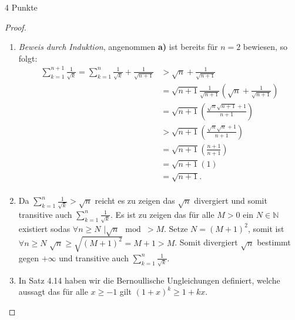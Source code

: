 \documentclass{problemset}
\begin{document}
\begin{problem}{4 Punkte}
\begin{proof}
	\begin{enumerate}
		\item \textit{Beweis durch Induktion}, angenommen \textbf{a)} ist bereits für $n=2$ bewiesen, so folgt: \begin{align*}
			      \sum_{k=1}^{n+1} \frac{1}{\sqrt{k}} = \sum_{k=1}^{n} \frac{1}{\sqrt{k}} + \frac{1}{\sqrt{n + 1}} & > \sqrt{n} + \frac{1}{\sqrt{n + 1}}                                              \\
			                                                                                                       & = \sqrt{n+1} \frac{1}{\sqrt{n+1}} \left(\sqrt{n} + \frac{1}{\sqrt{n + 1}}\right) \\
			                                                                                                       & = \sqrt{n+1} \left(\frac{\sqrt{n}\sqrt{n+1} + 1}{n + 1}\right)                   \\
			                                                                                                       & > \sqrt{n+1} \left(\frac{\sqrt{n}\sqrt{n} + 1}{n + 1}\right)                     \\
			                                                                                                       & = \sqrt{n+1} \left(\frac{n + 1}{n + 1}\right)                                    \\
			                                                                                                       & = \sqrt{n+1} (1)                                                                 \\
			                                                                                                       & = \sqrt{n+1} \tag*{\checkmark}.                                                  \\
		      \end{align*}
		\item Da $\sum_{k=1}^{n} \frac{1}{\sqrt{k}} > \sqrt{n}$ reicht es zu zeigen das $\sqrt{n}$ divergiert und somit transitive auch $\sum_{k=1}^{n} \frac{1}{\sqrt{k}}$.
		      Es ist zu zeigen das für alle $M > 0$ ein $N \in \mathbb{N}$ existiert sodas $\forall n \ge N$ $\mid \sqrt{n} \mod > M$.
		      Setze $N = {(M + 1)}^2$, somit ist $\forall n \ge N$ $\sqrt{n} \ge \sqrt{{(M + 1)}^2} = M+1 > M$.
		      Somit divergiert $\sqrt{n}$ bestimmt gegen $+\infty$ und transitive auch $\sum_{k=1}^{n} \frac{1}{\sqrt{k}}$.
		      \checkmark
		\item In Satz 4.14 haben wir die Bernoullische Ungleichungen definiert, welche aussagt das für alle $x \ge -1$ gilt ${(1+x)}^k \ge 1 + kx$.

\end{enumerate}
\end{proof}
\end{problem}
\end{document}
